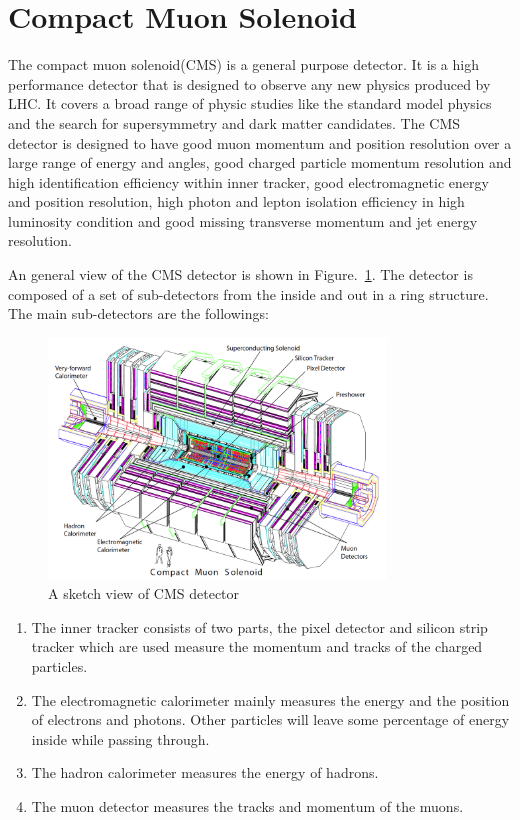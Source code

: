 \section{Compact Muon Solenoid}
The compact muon solenoid(CMS) is a general purpose detector. It is a high performance detector that is designed to observe any new physics produced by LHC. It covers a broad range of physic studies like the standard model physics and the search for supersymmetry and dark matter candidates. The CMS detector is designed to have good muon momentum and position resolution over a large range of energy and angles, good charged particle momentum resolution and high identification efficiency within inner tracker, good electromagnetic energy and position resolution, high photon and lepton isolation efficiency in high luminosity condition and good missing transverse momentum and jet energy resolution.  


An general view of the CMS detector is shown in Figure.~\ref{fig:CMS_sketch}. The detector is composed of a set of sub-detectors from the inside and out in a ring structure. The main sub-detectors are the followings:

\begin{figure}[htbp] 
\centering
\includegraphics[width=0.8\textwidth]{chapter3/CMS_detecter.png}
\caption{A sketch view of CMS detector~\cite{CMS_experiment}}
\label{fig:CMS_sketch}
\end{figure}


\begin{enumerate}[$\bullet$]
\item The inner tracker consists of two parts, the pixel detector and silicon strip tracker which are used measure the momentum and tracks of the charged particles.
\item The electromagnetic calorimeter mainly measures the energy and the position of electrons and photons. Other particles will leave some percentage of energy inside while passing through.
\item The hadron calorimeter measures the energy of hadrons. 
\item The muon detector measures the tracks and momentum of the muons.
\end{enumerate} 


